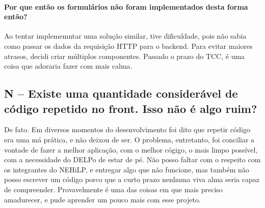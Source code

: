 \paragraph{Por que então os formulários não foram implementados desta forma então?} Ao tentar implememntar uma solução
similar, tive dificuldade, pois não sabia como passar os dados da requisição HTTP para o backend. Para evitar maiores
atrasos, decidi criar múltiplos componentes. Passado o prazo do TCC, é uma coisa que adoraria fazer com mais calma.

\subsection{N -- Existe uma quantidade considerável de código repetido no front. Isso não é algo ruim?}
\label{subsec:no-dry}

De fato. Em diversos momentos do desenvolvimento foi dito que repetir código era uma má prática, e não deixou de ser. O
problema, entretanto, foi conciliar a vontade de fazer a melhor aplicação, com o melhor cógigo, o mais limpo possível,
com a necessidade do DELPo de estar de pé. Não posso faltar com o respeito com os integrantes do NEHiLP, e entregar algo
que não funcione, mas também não posso escrever um código porco que a curto prazo nenhuma viva alma seria capaz de compreender.
Provavelmente é uma das coisas em que mais preciso amadurecer, e pude aprender um pouco mais com esse projeto.